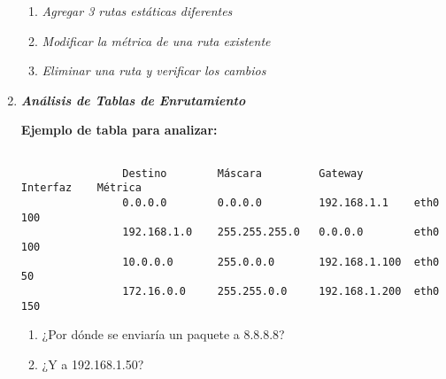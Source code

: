 \documentclass[12pt]{amsart}
\begin{document}
\begin{enumerate}
		\medskip
			\begin{enumerate}
						\medskip
						\item \textit{Agregar 3 rutas estáticas diferentes}
						\medskip
						
						\item \textit{Modificar la métrica de una ruta existente}
						\medskip

						\item \textit{Eliminar una ruta y verificar los cambios}
						\medskip

			\end{enumerate}
		
		\bigskip\bigskip

		\item \textbf{\textit{Análisis de Tablas de Enrutamiento}}
		
		\medskip\medskip
			\textbf{Ejemplo de tabla para analizar:}
			\begin{verbatim}

				Destino        Máscara         Gateway        Interfaz    Métrica
				0.0.0.0        0.0.0.0         192.168.1.1    eth0       100
				192.168.1.0    255.255.255.0   0.0.0.0        eth0       100
				10.0.0.0       255.0.0.0       192.168.1.100  eth0       50
				172.16.0.0     255.255.0.0     192.168.1.200  eth0       150

			\end{verbatim}

			\begin{enumerate}
						\medskip
						\item ¿Por dónde se enviaría un paquete a 8.8.8.8?
						\medskip
						
						\item ¿Y a 192.168.1.50?
						\medskip


\end{enumerate}
\end{enumerate}
\end{document}
